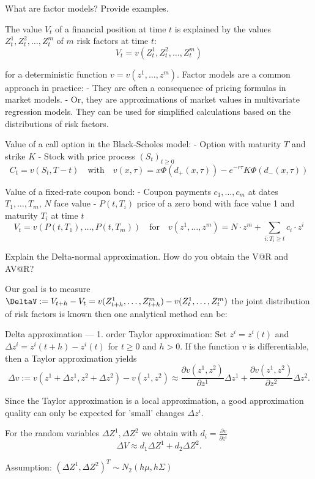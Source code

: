 What are factor models? Provide examples.

The value \(V_t\) of a financial position at time \(t\) is explained by the values \(Z_t^1, Z_t^2, \dots, Z_t^m\) of \(m\) 
risk factors at time \(t\):
\[V_t = v(Z_t^1, Z_t^2, \dots, Z_t^m)\]

for a deterministic function \(v = v(z^1, \dots, z^m)\).
Factor models are a common approach in practice:
- They are often a consequence of pricing formulas in market models.
- Or, they are approximations of market values in multivariate regression models.
They can be used for simplified calculations based on the distributions of risk factors.

Value of a call option in the Black-Scholes model:
- Option with maturity \(T\) and strike \(K\)
- Stock with price process \((S_t)_{t \geq 0}\)
\[C_t = v(S_t, T-t) \quad \text{with} \quad v(x,\tau) = x\Phi(d_+(x,\tau)) - e^{-r\tau} K \Phi(d_-(x,\tau))\]

Value of a fixed-rate coupon bond:
- Coupon payments \(c_1, \dots, c_m\) at dates \(T_1, \dots, T_m\), \(N\) face value
- \(P(t,T_i)\) price of a zero bond with face value 1 and maturity \(T_i\) at time \(t\)
\[V_t = v(P(t,T_1), \dots, P(t,T_m)) \quad \text{for} \quad v(z^1, \dots, z^m) = N \cdot z^m + \sum_{i: T_i \geq t} c_i \cdot z^i \]


Explain the Delta-normal approximation. How do you obtain the V@R and AV@R?

Our goal is to measure \( \DeltaV := V_{t+h} - V_t = v(Z^1_{t+h}, \dots, Z^m_{t+h}) - v(Z^1_{t}, \dots, Z^m_{t}) \)
the joint distribution of risk factors is known then one analytical method can be:

Delta approximation — 1. order Taylor approximation:
Set \(z^i = z^i(t)\) and \(\Delta z^i = z^i(t+h) - z^i(t)\) for \(t \geq 0\) and \(h > 0\).
If the function \(v\) is differentiable, then a Taylor approximation yields
\[\Delta v := v(z^1 + \Delta z^1, z^2 + \Delta z^2) - v(z^1, z^2) \approx \frac{\partial v(z^1, z^2)}{\partial z^1} \Delta z^1 + \frac{\partial v(z^1, z^2)}{\partial z^2} \Delta z^2.\]

Since the Taylor approximation is a local approximation, a good approximation quality can only be expected for 'small' changes \(\Delta z^i\).

For the random variables \(\Delta Z^1, \Delta Z^2\) we obtain with \(d_i = \frac{\partial v}{\partial z^i}\)
\[\Delta V \approx d_1 \Delta Z^1 + d_2 \Delta Z^2.\]

Assumption: \((\Delta Z^1, \Delta Z^2)^T \sim N_2(h\mu, h\Sigma)\)

